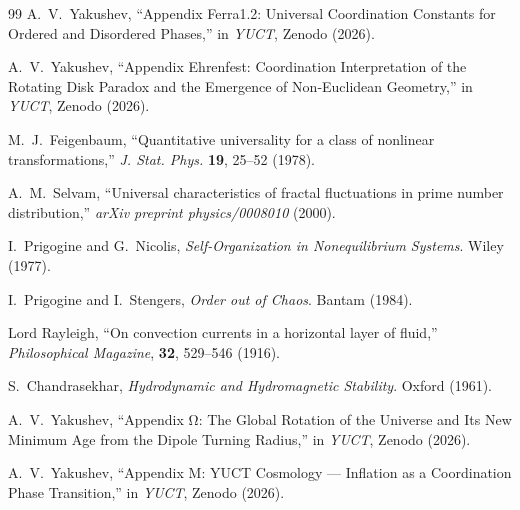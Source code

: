 \documentclass[11pt,a4paper]{article}
\begin{document}
\begin{thebibliography}{99}
		A.~V.~Yakushev, ``Appendix Ferra1.2: Universal Coordination Constants for Ordered and Disordered Phases,'' in \emph{YUCT}, Zenodo (2026).
		
		A.~V.~Yakushev, ``Appendix Ehrenfest: Coordination Interpretation of the Rotating Disk Paradox and the Emergence of Non‑Euclidean Geometry,'' in \emph{YUCT}, Zenodo (2026).
		
		M.~J.~Feigenbaum, ``Quantitative universality for a class of nonlinear transformations,'' \emph{J. Stat. Phys.} \textbf{19}, 25--52 (1978).
		
		A.~M.~Selvam, ``Universal characteristics of fractal fluctuations in prime number distribution,'' \emph{arXiv preprint physics/0008010} (2000).
		
		I.~Prigogine and G.~Nicolis, \emph{Self-Organization in Nonequilibrium Systems}. Wiley (1977).
		
		I.~Prigogine and I.~Stengers, \emph{Order out of Chaos}. Bantam (1984).
		
		Lord Rayleigh, ``On convection currents in a horizontal layer of fluid,'' \emph{Philosophical Magazine}, \textbf{32}, 529--546 (1916).
		
		S.~Chandrasekhar, \emph{Hydrodynamic and Hydromagnetic Stability}. Oxford (1961).
		
		A.~V.~Yakushev, ``Appendix Ω: The Global Rotation of the Universe and Its New Minimum Age from the Dipole Turning Radius,'' in \emph{YUCT}, Zenodo (2026).
		
		A.~V.~Yakushev, ``Appendix M: YUCT Cosmology — Inflation as a Coordination Phase Transition,'' in \emph{YUCT}, Zenodo (2026).
		
	\end{thebibliography}
	
\end{document}
